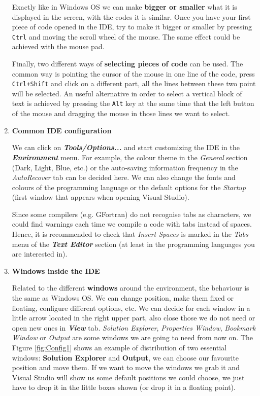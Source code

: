 \begin{enumerate}
    Exactly like in Windows OS we can make \textbf{bigger or smaller} what it is displayed in the screen, with the codes it is similar. Once you have your first piece of code opened in the IDE, try to make it bigger or smaller by pressing \texttt{Ctrl} and moving the scroll wheel of the mouse. The same effect could be achieved with the mouse pad.
    
    Finally, two different ways of \textbf{selecting pieces of code} can be used. The common way is pointing the cursor of the mouse in one line of the code, press \texttt{Ctrl+Shift} and click on a different part, all the lines between these two point will be selected. An useful alternative in order to select a vertical block of text is achieved by pressing the \texttt{Alt} key at the same time that the left button of the mouse and dragging the mouse in those lines we want to select.
    
    \item \textbf{Common IDE configuration}
    
    We can click on \textbf{\textit{Tools/Options...}} and start customizing the IDE in the \textbf{\textit{Environment}} menu. For example, the colour theme in the \textit{General} section (Dark, Light, Blue, etc.) or the auto-saving information frequency in the \textit{AutoRecover} tab can be decided here. We can also change the fonts and colours of the programming language or the default options for the \textit{Startup} (first window that appears when opening Visual Studio). 
    
    Since some compilers (e.g. GFortran) do not recognise tabs as characters, we could find warnings each time we compile a code with tabs instead of spaces. Hence, it is recommended to check that \textit{Insert Spaces} is marked in the \textit{Tabs} menu of the \textbf{\textit{Text Editor}} section (at least in the programming languages you are interested in).
    
    \item \textbf{Windows inside the IDE}
    
    Related to the different \textbf{windows} around the environment, the behaviour is the same as Windows OS. We can change position, make them fixed or floating, configure different options, etc. We can decide for each window in a little arrow located in the right upper part, also close those we do not need or open new ones in \textbf{\textit{View}} tab. \textit{Solution Explorer}, \textit{Properties Window}, \textit{Bookmark Window} or \textit{Output} are some windows we are going to need from now on. The Figure \ref{fig:Config1} shows an example of distribution of two essential windows: \textbf{Solution Explorer} and \textbf{Output}, we can choose our favourite position and move them. If we want to move the windows we grab it and Visual Studio will show us some default positions we could choose, we just have to drop it in the little boxes shown (or drop it in a floating point).
    

\end{enumerate}
